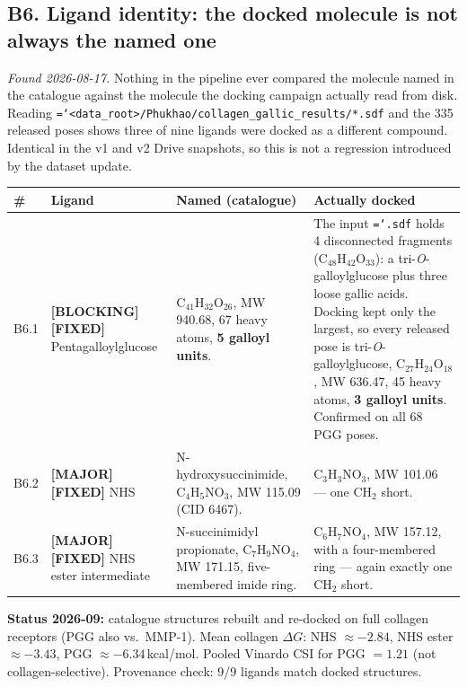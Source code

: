 \documentclass[11pt,a4paper]{article}
\newcommand{\ok}[1]{\textcolor{okgreen}{#1}}
\newcommand{\bad}[1]{\textcolor{badred}{#1}}
\newcommand{\warn}[1]{\textcolor{warnamber}{#1}}
\newcommand{\code}[1]{\texttt{\small\hyphenchar\font=`\-\relax #1}}
\newcommand{\SBLOCK}{\bad{\textbf{[BLOCKING]}}}
\newcommand{\SMAJOR}{\warn{\textbf{[MAJOR]}}}
\newcommand{\SFIXED}{\ok{\textbf{[FIXED]}}}
\begin{document}
\subsection{B6. Ligand identity: the docked molecule is not always the named one}

\emph{Found 2026-08-17.} Nothing in the pipeline ever compared the molecule
named in the catalogue against the molecule the docking campaign actually read
from disk. Reading
\code{<data\_root>/Phukhao/collagen\_gallic\_results/*.sdf} and the 335
released poses shows \bad{three of nine ligands were docked as a different
compound}. Identical in the v1 and v2 Drive snapshots, so this is not a
regression introduced by the dataset update.

\begin{longtable}{@{}L{0.6cm}L{3.4cm}L{5.0cm}L{4.9cm}@{}}
\toprule
\textbf{\#} & \textbf{Ligand} & \textbf{Named (catalogue)} & \textbf{Actually docked} \\
\midrule
\endhead
B6.1 & \SBLOCK{} \SFIXED{} Pentagalloylglucose &
  $\mathrm{C_{41}H_{32}O_{26}}$, MW 940.68, 67 heavy atoms,
  \textbf{5 galloyl units}. &
  The input \code{.sdf} holds \bad{4 disconnected fragments}
  ($\mathrm{C_{48}H_{42}O_{33}}$): a tri-\emph{O}-galloylglucose plus three
  loose gallic acids. Docking kept only the largest, so every released pose is
  \bad{tri-\emph{O}-galloylglucose}, $\mathrm{C_{27}H_{24}O_{18}}$, MW 636.47,
  45 heavy atoms, \textbf{3 galloyl units}. Confirmed on all 68 PGG poses. \\
B6.2 & \SMAJOR{} \SFIXED{} NHS &
  N-hydroxysuccinimide, $\mathrm{C_4H_5NO_3}$, MW 115.09 (CID 6467). &
  $\mathrm{C_3H_3NO_3}$, MW 101.06 --- \bad{one $\mathrm{CH_2}$ short}. \\
B6.3 & \SMAJOR{} \SFIXED{} NHS ester intermediate &
  N-succinimidyl propionate, $\mathrm{C_7H_9NO_4}$, MW 171.15, five-membered
  imide ring. &
  $\mathrm{C_6H_7NO_4}$, MW 157.12, with a \bad{four-membered ring} ---
  again exactly one $\mathrm{CH_2}$ short. \\
\bottomrule
\end{longtable}

\noindent\textbf{Status 2026-09:} catalogue structures rebuilt and re-docked on full collagen receptors (PGG also vs.\ MMP-1). Mean collagen $\Delta G$: NHS $\approx -2.84$, NHS ester $\approx -3.43$, PGG $\approx -6.34$\,kcal/mol. Pooled Vinardo CSI for PGG $= 1.21$ (not collagen-selective). Provenance check: 9/9 ligands match docked structures.\par\bigskip
\end{document}
